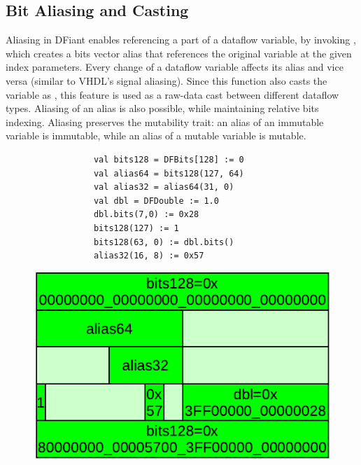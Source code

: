 \subsection{Bit Aliasing and Casting}
Aliasing in DFiant enables referencing a part of a dataflow variable, by invoking , which creates a bits vector alias that references the original variable at the given index parameters. Every change of a dataflow variable affects its alias and vice versa (similar to VHDL's signal aliasing). Since this function also casts the variable as , this feature is used as a raw-data cast between different dataflow types. Aliasing of an alias is also possible, while maintaining relative bits indexing. Aliasing preserves the mutability trait: an alias of an immutable variable is immutable, while an alias of a mutable variable is mutable. 

\vspace*{3ex}
\begin{figure}[h]
	\centering
	\hfill
	\begin{minipage}[b][3.6cm][b]{0.49\linewidth}
		\vfill
		\begin{verbatim}
			val bits128 = DFBits[128] := 0
			val alias64 = bits128(127, 64)
			val alias32 = alias64(31, 0)
			val dbl = DFDouble := 1.0
			dbl.bits(7,0) := 0x28
			bits128(127) := 1
			bits128(63, 0) := dbl.bits()
			alias32(16, 8) := 0x57		    
		\end{verbatim}
		\vfill
	\end{minipage}%
	\hfill
	\begin{minipage}[b][3.6cm][b]{0.45\linewidth}
		\centering
		\vfill
		\includegraphics[width=0.8\linewidth]{graphics/Aliasing.pdf} 
		\vfill
	\end{minipage}
	\hfill
	\label{fig:Aliasing}
\end{figure}

